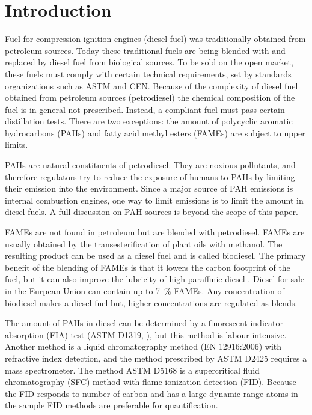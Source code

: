 \documentclass[preprint,12pt]{elsarticle}
\begin{document}
\linenumbers

\section{Introduction}
\label{S:1}

Fuel for compression-ignition engines (diesel fuel) was traditionally obtained
from petroleum sources. Today these traditional fuels are being blended with and
replaced by diesel fuel from biological sources. To be sold on the open market,
these fuels must comply with certain technical requirements, set by standards
organizations such as ASTM and CEN. Because of the complexity of diesel fuel
obtained from petroleum sources (petrodiesel) the chemical composition of the
fuel is in general not prescribed. Instead, a compliant fuel must pass certain
distillation tests. There are two exceptions: the amount of polycyclic
aromatic hydrocarbons (PAHs) and fatty acid methyl esters (FAMEs) are subject to
upper limits.

PAHs are natural constituents of petrodiesel. They are noxious pollutants, and
therefore regulators try to reduce the exposure of humans to PAHs by limiting
their emission into the environment. Since a major source of PAH emissions is
internal combustion engines, one way to limit emissions is to limit the amount
in diesel fuels. A full discussion on PAH sources is beyond the scope of this paper. 

FAMEs are not found in petroleum but are blended with petrodiesel. FAMEs are
usually obtained by the transesterification of plant oils with methanol. The
resulting product can be used as a diesel fuel and is called biodiesel.  The
primary benefit of the blending of FAMEs is that it lowers the carbon footprint
of the fuel, but it can also improve the lubricity of high-paraffinic diesel
\citep{Rodriguez-Fernandez2019}. Diesel for sale in the Eurpean Union can
contain up to \SI{7}{\percent} FAMEs. Any concentration of biodiesel makes a
diesel fuel but, higher concentrations are regulated as blends.

The amount of PAHs in diesel can be determined by a fluorescent indicator
absorption (FIA) test (ASTM D1319, \citep{Knight1956}), but this method is
labour-intensive. Another method is a liquid chromatography method (EN
12916:2006) with refractive index detection, and the method prescribed by ASTM
D2425 requires a mass spectrometer. The method ASTM D5168 is a supercritical
fluid chromatography (SFC) method with flame ionization detection (FID). Because
the FID responds to number of carbon and has a large dynamic range atoms in the
sample FID methods are preferable for quantification.
\end{document}
